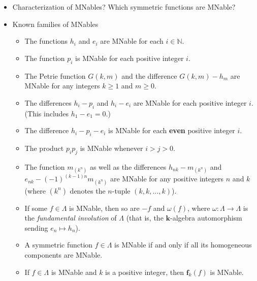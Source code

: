 \documentclass[numbers=enddot,12pt,final,onecolumn,notitlepage]{scrartcl}%
\newcommand{\defn}[1]{{\color{darkred}\emph{#1}}}
\newcommand{\0}{\phantom{c}}
\newcommand{\nowbox}{\hphantom{x} \vspace{-1.5pc}}
\begin{document}
\begin{itemize}
\item \nowbox
\begin{question}{Characterization of MNables?}{}
Which symmetric functions are MNable?
\end{question}

\item \nowbox
\begin{theorem}{Known families of MNables}{}

\begin{itemize}
\item The functions $h_{i}$ and $e_{i}$ are MNable for each $i\in\mathbb{N}$.

\item The function $p_{i}$ is MNable for each positive integer $i$.

\item The Petrie function $G\left(  k,m\right)  $ and the difference $G\left(
k,m\right)  -h_{m}$ are MNable for any integers $k\geq1$ and $m\geq0$.

\item The differences $h_{i}-p_{i}$ and $h_{i}-e_{i}$ are MNable for each
positive integer $i$. (This includes $h_{1}-e_{1}=0$.)

\item The difference $h_{i}-p_{i}-e_{i}$ is MNable for each \textbf{even}
positive integer $i$.

\item The product $p_{i}p_{j}$ is MNable whenever $i>j>0$.

\item The function $m_{\left(  k^{n}\right)  }$ as well as the differences
$h_{nk}-m_{(k^{n})}$ and $e_{nk}-\left(  -1\right)  ^{\left(  k-1\right)
n}m_{\left(  k^{n}\right)  }$ are MNable for any positive integers $n$ and $k$
(where $\left(  k^{n}\right)  $ denotes the $n$-tuple $\left(  k,k,\ldots
,k\right)  $).

\item If some $f\in\Lambda$ is MNable, then so are $-f$ and $\omega\left(
f\right)  $, where $\omega:\Lambda\rightarrow\Lambda$ is the
\defn{fundamental involution} of $\Lambda$ (that is, the $\mathbf{k}$-algebra
automorphism sending $e_{n}\mapsto h_{n}$).

\item A symmetric function $f\in\Lambda$ is MNable if and only if all its
homogeneous components are MNable.

\item If $f\in\Lambda$ is MNable and $k$ is a positive integer, then
$\mathbf{f}_{k}\left(  f\right)  $ is MNable.


\end{itemize}
\end{theorem}
\end{itemize}
\end{document}
